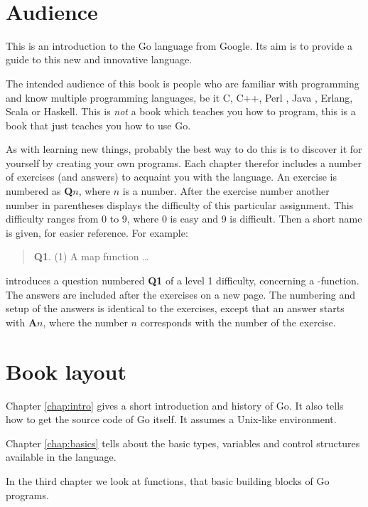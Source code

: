{\textit{}\\ \textsc{}}

\section{Audience}
\noindent{}This is an introduction to the Go language from Google. Its aim
is to provide a guide to this new and innovative language. 

The intended audience of this book is people who are familiar with programming
and know multiple programming languages, be it C\cite{c}, C++\cite{c++}, 
Perl \cite{perl}, Java \cite{java}, Erlang\cite{erlang}, Scala\cite{scala} or
Haskell\cite{haskell}. This is \emph{not} a book which teaches you how to 
program, this is a book that just teaches you how to use Go.

As with
learning new things, probably the best way to do this is to discover it for
yourself by creating your own programs.
Each chapter therefor includes a number of exercises (and answers)
to acquaint you with the language.
An exercise
is numbered as \textbf{Q$n$}, where $n$ is a number. After the
exercise number another number in parentheses displays the difficulty
of this particular assignment. This difficulty ranges from 0 to
9, where 0 is easy and 9 is difficult. 
Then a short name is given, for easier reference.
For example:
\begin{verse}
\textbf{Q1}. (1) A map function \ldots
\end{verse}
introduces a question numbered \textbf{Q1} of a level 1 difficulty, concerning a
-function. The answers are included after the exercises on a
new page.
The numbering and setup of the answers is identical to the
exercises, except that an answer starts with \textbf{A$n$}, where the
number $n$ corresponds with the number of the exercise.

\section{Book layout}
Chapter \ref{chap:intro} gives a short introduction and history of Go. It also
tells how to get the source code of Go itself. It assumes a Unix-like environment.

Chapter \ref{chap:basics} tells about the basic types, variables and control
structures available in the language.

In the third chapter we look at functions, that basic building blocks of Go programs.

